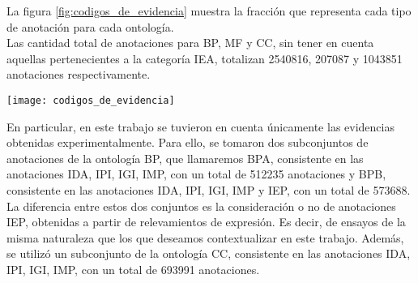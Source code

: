 La figura \ref{fig:codigos_de_evidencia} muestra la fracción que representa cada tipo de anotación para cada ontología.\\
Las cantidad total de anotaciones para BP, MF y CC, sin tener en cuenta aquellas pertenecientes a la categoría IEA, totalizan 2540816, 207087 y 1043851 anotaciones respectivamente.
\begin{center}
    \texttt{[image: codigos\_de\_evidencia]}
    \label{fig:codigos_de_evidencia}
\end{center}
En particular, en este trabajo se tuvieron en cuenta únicamente las evidencias obtenidas experimentalmente. Para ello, se tomaron dos subconjuntos de anotaciones de la ontología BP, que llamaremos BPA, consistente en las anotaciones IDA, IPI, IGI, IMP, con un total de 512235 anotaciones y BPB, consistente en las anotaciones IDA, IPI, IGI, IMP y IEP, con un total de 573688. La diferencia entre estos dos conjuntos es la consideración o no de anotaciones IEP, obtenidas a partir de relevamientos de expresión. Es decir, de ensayos de la misma naturaleza que los que deseamos contextualizar en este trabajo. Además, se utilizó un subconjunto de la ontología CC, consistente en las anotaciones IDA, IPI, IGI, IMP, con un total de 693991 anotaciones. \cite{Pandey2008, Resnik1995, Bose2016, Pesquita2009, Berenstein2014, Ashburner}
